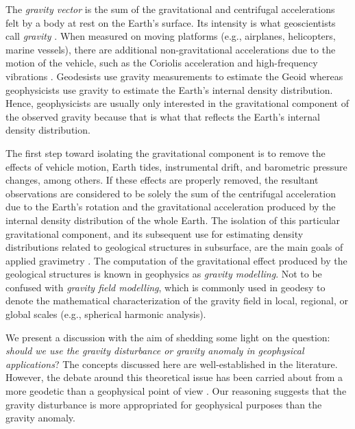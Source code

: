 \documentclass[extra]{gji}
\begin{document}
The \textit{gravity vector} is the sum of the gravitational and centrifugal
accelerations felt by a body at rest on the Earth's surface.
Its intensity is what geoscientists call \textit{gravity}
\citep{heiskanen-moritz1967, hofmann-wellenhof-moritz2005}.
When measured on moving platforms (e.g., airplanes,
helicopters, marine vessels), there are additional
non-gravitational accelerations due to the motion of the vehicle,
such as the Coriolis acceleration and high-frequency vibrations
\citep{glennie-etal2000,nabighian-etal2005-grav,baumann-etal2012}.
Geodesists use gravity measurements to estimate the Geoid \citep{li2001}
whereas geophysicists use gravity to estimate the Earth's
internal density distribution.
Hence, geophysicists are usually only interested
in the gravitational component of the observed gravity
because that is what that reflects the Earth's internal density distribution.

The first step toward isolating the gravitational component
is to remove the effects of vehicle motion, Earth tides, instrumental drift,
and barometric pressure changes, among others.
If these effects are properly removed,
the resultant observations are considered to be solely
the sum of the centrifugal acceleration due to the Earth's rotation and
the gravitational acceleration produced by
the internal density distribution of the whole Earth.
The isolation of this particular gravitational component,
and its subsequent use for estimating density
distributions related to geological structures in subsurface,
are the main goals of applied gravimetry \citep{blakely1996}.
The computation of the gravitational effect produced by
the geological structures is known in geophysics as
\textit{gravity modelling}.
Not to be confused with \textit{gravity field modelling}, which
is commonly used in geodesy to denote the mathematical characterization of the
gravity field in local, regional, or global scales (e.g., spherical harmonic
analysis).

We present a discussion with the aim of shedding some light on the question:
\textit{should we use the gravity disturbance or gravity anomaly in geophysical
applications}?
The concepts discussed here are well-established in the literature.
However, the debate around this theoretical issue has been
carried about from a more geodetic than a geophysical point of view
\citep{lafehr1991,chapin1996,li2001,fairhead2003,
hackney-featherstone2003,hinze2005}.
Our reasoning suggests that the gravity disturbance is more appropriated for
geophysical purposes than the gravity anomaly.
\end{document}
